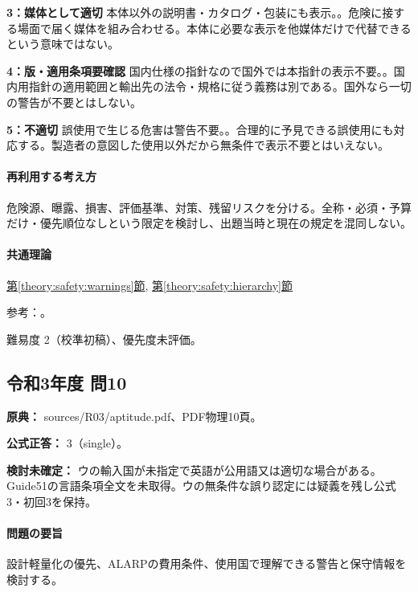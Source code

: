 \noindent\textbf{3：媒体として適切} 本体以外の説明書・カタログ・包装にも表示。。危険に接する場面で届く媒体を組み合わせる。本体に必要な表示を他媒体だけで代替できるという意味ではない。\par

\noindent\textbf{4：版・適用条項要確認} 国内仕様の指針なので国外では本指針の表示不要。。国内用指針の適用範囲と輸出先の法令・規格に従う義務は別である。国外なら一切の警告が不要とはしない。\par

\noindent\textbf{5：不適切} 誤使用で生じる危害は警告不要。。合理的に予見できる誤使用にも対応する。製造者の意図した使用以外だから無条件で表示不要とはいえない。\par

\paragraph{再利用する考え方} 危険源、曝露、損害、評価基準、対策、残留リスクを分ける。全称・必須・予算だけ・優先順位なしという限定を検討し、出題当時と現在の規定を混同しない。

\paragraph{共通理論} \hyperref[theory:safety:warnings]{第\ref*{theory:safety:warnings}節}, \hyperref[theory:safety:hierarchy]{第\ref*{theory:safety:hierarchy}節}

\par 参考：\cite{saf_aeha,saf_guide51}。

\par 難易度 2（校準初稿）、優先度未評価。

\subsection{令和3年度 問10}
\label{q:r03-reg-apt-10}

\noindent\textbf{原典：} sources/R03/aptitude.pdf、PDF物理10頁。

\textbf{公式正答：} 3（single）。

\par\textbf{検討未確定：} ウの輸入国が未指定で英語が公用語又は適切な場合がある。Guide51の言語条項全文を未取得。ウの無条件な誤り認定には疑義を残し公式3・初回3を保持。

\paragraph{問題の要旨} 設計軽量化の優先、ALARPの費用条件、使用国で理解できる警告と保守情報を検討する。

